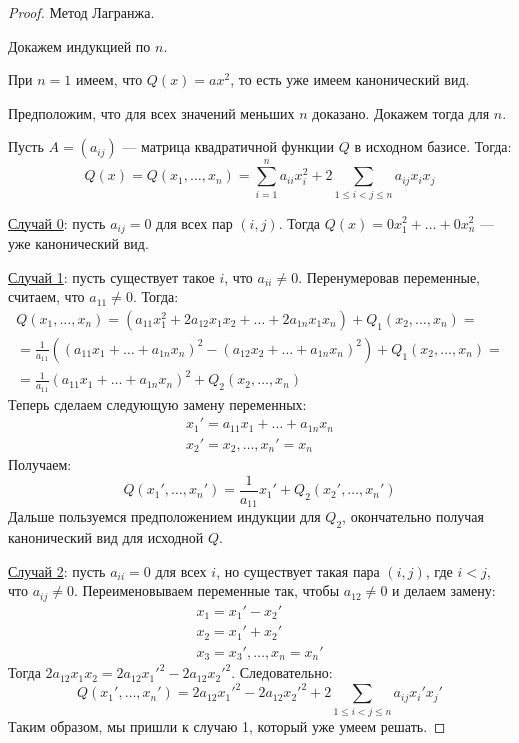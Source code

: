 \begin{proof} Метод Лагранжа.

Докажем индукцией по $n$.

При $n = 1$ имеем, что $Q(x) = ax^2$, то есть уже имеем канонический вид.

Предположим, что для всех значений меньших $n$ доказано. Докажем тогда для $n$.

Пусть $A = (a_{ij})$ --- матрица квадратичной функции $Q$ в исходном базисе. Тогда:
$$
Q(x) = Q(x_1, \ldots, x_n) = \sum_{i = 1}^{n}a_{ii}x_i^2 + 2\sum_{1 \leqslant i < j \leqslant n}a_{ij}x_ix_j
$$

\underline{Случай 0}: пусть $a_{ij} = 0$ для всех пар $(i, j)$. Тогда $Q(x) = 0x_1^2 + \ldots + 0x_n^2$ --- уже канонический вид.

\underline{Случай 1}: пусть существует такое $i$, что $a_{ii} \neq 0$. Перенумеровав переменные, считаем, что $a_{11} \neq 0$. Тогда:
\begin{gather*}
Q(x_1, \ldots, x_n) = (a_{11}x_1^2 + 2a_{12}x_1x_2 + \ldots + 2a_{1n}x_1x_n) + Q_1(x_2, \ldots, x_n) = \\
= \frac{1}{a_{11}}\left((a_{11}x_1 + \ldots + a_{1n}x_n)^2 - (a_{12}x_2 + \ldots + a_{1n}x_n)^2  \right) + Q_1(x_2, \ldots, x_n) = \\
= \frac{1}{a_{11}}(a_{11}x_1 + \ldots + a_{1n}x_n)^2 + Q_2(x_2, \ldots, x_n) 
\end{gather*}
Теперь сделаем следующую замену переменных:
\begin{gather*}
x_1' = a_{11}x_1 + \ldots + a_{1n}x_n \\
x_2' = x_2, \ldots, x_n' = x_n
\end{gather*}
Получаем:
$$
Q(x_1', \ldots, x_n') = \frac{1}{a_{11}}x_1' + Q_2(x_2', \ldots, x_n')
$$
Дальше пользуемся предположением индукции для $Q_2$, окончательно получая канонический вид для исходной $Q$.

\underline{Случай 2}: пусть $a_{ii} = 0$ для всех $i$, но существует такая пара $(i, j)$, где $i < j$, что $a_{ij} \neq 0$. Переименовываем переменные так, чтобы $a_{12} \neq 0$ и делаем замену:
\begin{gather*}
x_1 = x_1' - x_2' \\
x_2 = x_1' + x_2' \\
x_3 = x_3', \ldots, x_n = x_n'
\end{gather*}
Тогда $2a_{12}x_1x_2 = 2a_{12}x_1'^2 - 2a_{12}x_2'^2$. Следовательно:
$$
Q(x_1', \ldots, x_n') = 2a_{12}x_1'^2 - 2a_{12}x_2'^2 + 2\sum_{1 \leqslant i < j \leqslant n}a_{ij}x_i'x_j'
$$
Таким образом, мы пришли к случаю 1, который уже умеем решать.
\end{proof}

